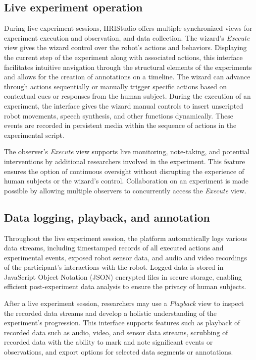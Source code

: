 \documentclass[letterpaper, 10 pt, conference]{ieeeconf}
\begin{document}
\subsection{Live experiment operation}

During live experiment sessions, HRIStudio offers multiple synchronized views for experiment execution and observation, and data collection. The wizard's \emph{Execute} view gives the wizard control over the robot's actions and behaviors. Displaying the current step of the experiment along with associated actions, this interface facilitates intuitive navigation through the structural elements of the experiments and allows for the creation of annotations on a timeline. The wizard can advance through actions sequentially or manually trigger specific actions based on contextual cues or responses from the human subject. During the execution of an experiment, the interface gives the wizard manual controls to insert unscripted robot movements, speech synthesis, and other functions dynamically. These events are recorded in persistent media within the sequence of actions in the experimental script.

The observer's \emph{Execute} view supports live monitoring, note-taking, and potential interventions by additional researchers involved in the experiment. This feature ensures the option of continuous oversight without disrupting the experience of human subjects or the wizard's control. Collaboration on an experiment is made possible by allowing multiple observers to concurrently access the \emph{Execute} view.

\subsection{Data logging, playback, and annotation}

Throughout the live experiment session, the platform automatically logs various data streams, including timestamped records of all executed actions and experimental events, exposed robot sensor data, and audio and video recordings of the participant's interactions with the robot. Logged data is stored in JavaScript Object Notation (JSON)  encrypted files in secure storage, enabling efficient post-experiment data analysis to ensure the privacy of human subjects.

After a live experiment session, researchers may use a \emph{Playback} view to inspect the recorded data streams and develop a holistic understanding of the experiment's progression. This interface supports features such as playback of recorded data such as audio, video, and sensor data streams, scrubbing of recorded data with the ability to mark and note significant events or observations, and export options for selected data segments or annotations.
\end{document}
